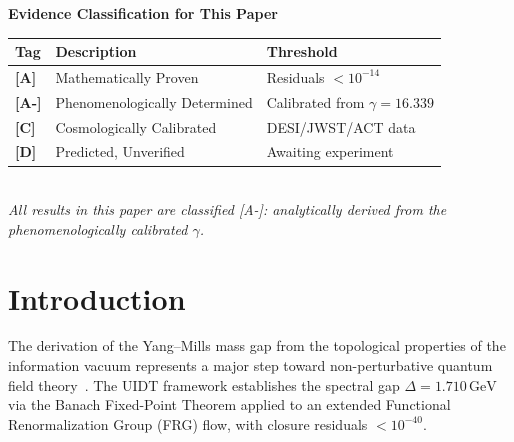 \documentclass[12pt,a4paper,twoside]{article}
\theoremstyle{plain}
\theoremstyle{definition}
\theoremstyle{remark}
\newcommand{\UIDT}{\textsc{UIDT}}
\newcommand{\GeV}{\,\mathrm{GeV}}
\begin{document}
\vspace{1em}
\begin{center}
\begin{tcolorbox}[
    enhanced,
    colback=gray!4,
    frame hidden,
    boxrule=0pt,
    arc=2pt,
    drop shadow={opacity=0.04, shadow xshift=1pt, shadow yshift=1pt},
    width=0.95\textwidth,
    top=10pt, bottom=10pt, left=12pt, right=12pt
]
\centering
{\small\sffamily\bfseries Evidence Classification for This Paper}\\[6pt]
\begin{tabular}{@{} >{\bfseries}l l l @{}}
\toprule
Tag & Description & Threshold \\
\midrule
\textcolor{catA}{[A]} & Mathematically Proven & Residuals $< 10^{-14}$ \\
\textcolor{catAminus}{[A-]} & Phenomenologically Determined & Calibrated from $\gamma = 16.339$ \\
\textcolor{catC}{[C]} & Cosmologically Calibrated & DESI/JWST/ACT data \\
\textcolor{catD}{[D]} & Predicted, Unverified & Awaiting experiment \\
\bottomrule
\end{tabular}\\[6pt]
{\footnotesize\itshape All results in this paper are classified \textcolor{catAminus}{[A-]}:
analytically derived from the phenomenologically calibrated $\gamma$.}
\end{tcolorbox}
\end{center}

\clearpage
\tableofcontents
\clearpage
\pagestyle{csfpaper}


\section{Introduction}
\label{sec:intro}

The derivation of the Yang--Mills mass gap from the topological properties of
the information vacuum represents a major step toward non-perturbative quantum
field theory~\cite{Rietz2026}. The \UIDT{} framework establishes the spectral gap
$\Delta = 1.710\GeV$ via the Banach Fixed-Point Theorem applied to an extended
Functional Renormalization Group (FRG) flow, with closure residuals
$< 10^{-40}$.
\end{document}
